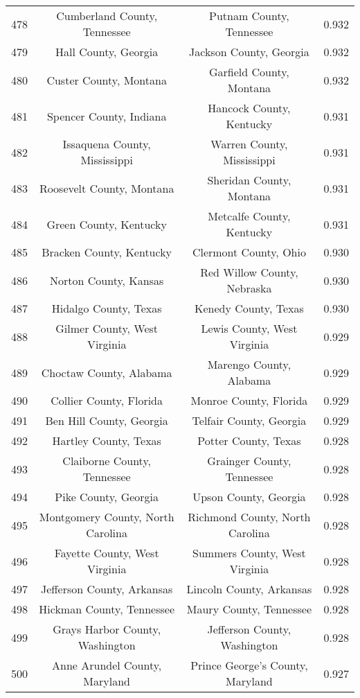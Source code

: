 \begin{longtable}{cccc}
  478 & Cumberland County, Tennessee & Putnam County, Tennessee & 0.932 \\ 
  479 & Hall County, Georgia & Jackson County, Georgia & 0.932 \\ 
  480 & Custer County, Montana & Garfield County, Montana & 0.932 \\ 
  481 & Spencer County, Indiana & Hancock County, Kentucky & 0.931 \\ 
  482 & Issaquena County, Mississippi & Warren County, Mississippi & 0.931 \\ 
  483 & Roosevelt County, Montana & Sheridan County, Montana & 0.931 \\ 
  484 & Green County, Kentucky & Metcalfe County, Kentucky & 0.931 \\ 
  485 & Bracken County, Kentucky & Clermont County, Ohio & 0.930 \\ 
  486 & Norton County, Kansas & Red Willow County, Nebraska & 0.930 \\ 
  487 & Hidalgo County, Texas & Kenedy County, Texas & 0.930 \\ 
  488 & Gilmer County, West Virginia & Lewis County, West Virginia & 0.929 \\ 
  489 & Choctaw County, Alabama & Marengo County, Alabama & 0.929 \\ 
  490 & Collier County, Florida & Monroe County, Florida & 0.929 \\ 
  491 & Ben Hill County, Georgia & Telfair County, Georgia & 0.929 \\ 
  492 & Hartley County, Texas & Potter County, Texas & 0.928 \\ 
  493 & Claiborne County, Tennessee & Grainger County, Tennessee & 0.928 \\ 
  494 & Pike County, Georgia & Upson County, Georgia & 0.928 \\ 
  495 & Montgomery County, North Carolina & Richmond County, North Carolina & 0.928 \\ 
  496 & Fayette County, West Virginia & Summers County, West Virginia & 0.928 \\ 
  497 & Jefferson County, Arkansas & Lincoln County, Arkansas & 0.928 \\ 
  498 & Hickman County, Tennessee & Maury County, Tennessee & 0.928 \\ 
  499 & Grays Harbor County, Washington & Jefferson County, Washington & 0.928 \\ 
  500 & Anne Arundel County, Maryland & Prince George's County, Maryland & 0.927 \\ 

\end{longtable}

